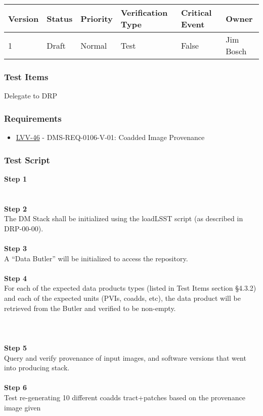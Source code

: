 \begin{longtable}[]{@{}llllll@{}}
\toprule
Version & Status & Priority & Verification Type & Critical Event &
Owner\tabularnewline
\midrule
\endhead
1 & Draft & Normal & Test & False & Jim Bosch\tabularnewline
\bottomrule
\end{longtable}

\hypertarget{test-items-153}{%
\subsubsection{Test Items}\label{test-items-153}}

Delegate to DRP

\hypertarget{requirements-154}{%
\subsubsection{Requirements}\label{requirements-154}}

\begin{itemize}
\tightlist
\item
  \href{https://jira.lsstcorp.org/browse/LVV-46}{LVV-46} -
  DMS-REQ-0106-V-01: Coadded Image Provenance
\end{itemize}

\hypertarget{test-script-154}{%
\subsubsection{Test Script}\label{test-script-154}}

\textbf{Step 1}\\
~\\
~\\
\textbf{Step 2}\\
The DM Stack shall be initialized using the loadLSST script (as
described in DRP-00-00).\\
~\\
\textbf{Step 3}\\
A ``Data Butler'' will be initialized to access the repository.\\
~\\
\textbf{Step 4}\\
For each of the expected data products types (listed in Test Items
section §4.3.2) and each of the expected units (PVIs, coadds, etc), the
data product will be retrieved from the Butler and verified to be
non-empty.\\
~\\
~\\
~\\
\textbf{Step 5}\\
Query and verify provenance of input images, and software versions that
went into producing stack.\\
~\\
\textbf{Step 6}\\
Test re-generating 10 different coadds tract+patches based on the
provenance image given\\
~\\

